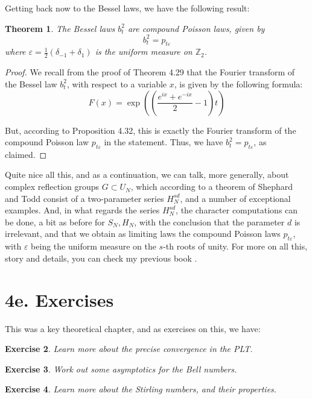 \documentclass[12pt]{amsbook}
\newtheorem{theorem}{Theorem}[chapter]
\newtheorem{exercise}[theorem]{Exercise}
\begin{document}
Getting back now to the Bessel laws, we have the following result:


\begin{theorem}
The Bessel laws $b^2_t$ are compound Poisson laws, given by
$$b^2_t=p_{t\varepsilon}$$
where $\varepsilon=\frac{1}{2}(\delta_{-1}+\delta_1)$ is the uniform measure on $\mathbb Z_2$.
\end{theorem}

\begin{proof}
We recall from the proof of Theorem 4.29 that the Fourier transform of the Bessel law $b^2_t$, with respect to a variable $x$, is given by the following formula:
$$F(x)=\exp\left(\left(\frac{e^{ix}+e^{-ix}}{2}-1\right)t\right)$$

But, according to Proposition 4.32, this is exactly the Fourier transform of the compound Poisson law $p_{t\varepsilon}$ in the statement. Thus, we have $b^2_t=p_{t\varepsilon}$, as claimed.
\end{proof}

Quite nice all this, and as a continuation, we can talk, more generally, about complex reflection groups $G\subset U_N$, which according to a theorem of Shephard and Todd consist of a two-parameter series $H_N^{sd}$, and a number of exceptional examples. And, in what regards the series $H_N^{sd}$, the character computations can be done, a bit as before for $S_N,H_N$, with the conclusion that the parameter $d$ is irrelevant, and that we obtain as limiting laws the compound Poisson laws $p_{t\varepsilon}$, with $\varepsilon$ being the uniform measure on the $s$-th roots of unity. For more on all this, story and details, you can check my previous book \cite{ba1}.

\section*{4e. Exercises}

This was a key theoretical chapter, and as exercises on this, we have:

\begin{exercise}
Learn more about the precise convergence in the PLT.
\end{exercise}

\begin{exercise}
Work out some asymptotics for the Bell numbers.
\end{exercise}

\begin{exercise}
Learn more about the Stirling numbers, and their properties.
\end{exercise}
\end{document}
